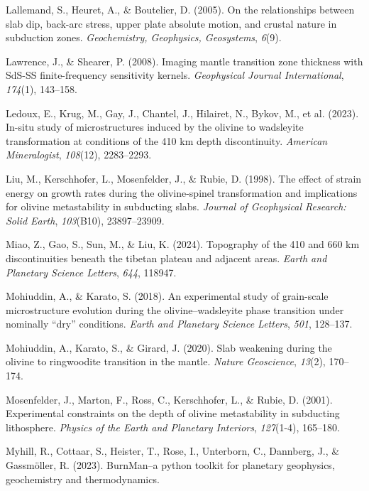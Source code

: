 \documentclass[draft,linenumbers]{agujournal2019}
\newlength{\cslhangindent}
\newenvironment{CSLReferences}[2]
 {\begin{list}{}{
  \setlength{\itemindent}{0pt}
  \setlength{\leftmargin}{0pt}
  \setlength{\parsep}{0pt}
  \ifodd #1
   \setlength{\leftmargin}{\cslhangindent}
   \setlength{\itemindent}{-\cslhangindent}
  \fi
  \setlength{\itemsep}{#2\baselineskip}
  }
  \item\relax}
 {\end{list}}
\begin{document}
\begin{CSLReferences}{1}{0}
Lallemand, S., Heuret, A., \& Boutelier, D. (2005). On the relationships
between slab dip, back-arc stress, upper plate absolute motion, and
crustal nature in subduction zones. \emph{Geochemistry, Geophysics,
Geosystems}, \emph{6}(9).

Lawrence, J., \& Shearer, P. (2008). Imaging mantle transition zone
thickness with SdS-SS finite-frequency sensitivity kernels.
\emph{Geophysical Journal International}, \emph{174}(1), 143--158.

{Ledoux, E., Krug, M., Gay, J., Chantel, J., Hilairet, N., Bykov, M., et
al.} (2023). In-situ study of microstructures induced by the olivine to
wadsleyite transformation at conditions of the 410 km depth
discontinuity. \emph{American Mineralogist}, \emph{108}(12), 2283--2293.

Liu, M., Kerschhofer, L., Mosenfelder, J., \& Rubie, D. (1998). The
effect of strain energy on growth rates during the olivine-spinel
transformation and implications for olivine metastability in subducting
slabs. \emph{Journal of Geophysical Research: Solid Earth},
\emph{103}(B10), 23897--23909.

Miao, Z., Gao, S., Sun, M., \& Liu, K. (2024). Topography of the 410 and
660 km discontinuities beneath the tibetan plateau and adjacent areas.
\emph{Earth and Planetary Science Letters}, \emph{644}, 118947.

Mohiuddin, A., \& Karato, S. (2018). An experimental study of
grain-scale microstructure evolution during the olivine--wadsleyite
phase transition under nominally {``dry''} conditions. \emph{Earth and
Planetary Science Letters}, \emph{501}, 128--137.

Mohiuddin, A., Karato, S., \& Girard, J. (2020). Slab weakening during
the olivine to ringwoodite transition in the mantle. \emph{Nature
Geoscience}, \emph{13}(2), 170--174.

Mosenfelder, J., Marton, F., Ross, C., Kerschhofer, L., \& Rubie, D.
(2001). Experimental constraints on the depth of olivine metastability
in subducting lithosphere. \emph{Physics of the Earth and Planetary
Interiors}, \emph{127}(1-4), 165--180.

Myhill, R., Cottaar, S., Heister, T., Rose, I., Unterborn, C., Dannberg,
J., \& Gassmöller, R. (2023). BurnMan--a python toolkit for planetary
geophysics, geochemistry and thermodynamics.


\end{CSLReferences}
\end{document}
